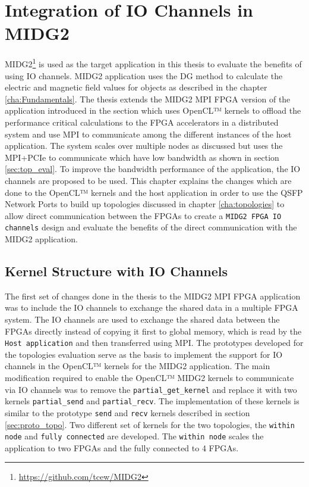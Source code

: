 \chapter{Integration of IO Channels in MIDG2}
\label{cha:sys_arch}

MIDG2\footnote{\url{https://github.com/tcew/MIDG2}} is used as the target
application in this thesis to evaluate the benefits of using IO channels.
MIDG2 application uses the \ac{DG} method to calculate the electric and magnetic
field values for objects as described in the chapter \ref{cha:Fundamentals}.
The thesis extends the MIDG2 MPI FPGA version of the application introduced in the
section \label{sec:midge_mpi} which uses OpenCL™ kernels to
offload the performance critical calculations to the FPGA accelerators in a
distributed system and use MPI to communicate among the different instances of the
host application. The system scales over multiple nodes as discussed but
uses the MPI+PCIe to communicate which have low bandwidth as shown in section
\ref{sec:top_eval}. To improve the bandwidth performance of the application,
the IO channels are proposed to be used. This chapter explains the changes
which are done to the OpenCL™ kernels and the host application in order to use
the QSFP Network Ports to build up topologies discussed in chapter
\ref{cha:topologies} to allow direct communication between the FPGAs to create a
\texttt{MIDG2 FPGA IO channels} design
and evaluate the benefits of the direct communication with the MIDG2 application.

\section{Kernel Structure with IO Channels}
\label{sec:struc_iochan}

The first set of changes done in the thesis to the MIDG2 MPI FPGA application
was to include the IO channels to exchange the shared data in a multiple FPGA system.
The IO channels are used to exchange the shared data between the FPGAs directly instead
of copying it first to global memory, which is read by the \texttt{Host application}
and then transferred using MPI. The prototypes developed for the topologies evaluation
serve as the basis to implement the support for IO channels in the OpenCL™ kernels for
the MIDG2 application. The main modification required to enable the OpenCL™ MIDG2
kernels to communicate via IO channels
was to remove the \texttt{partial\_get\_kernel} and replace it with two kernels
\texttt{partial\_send} and \texttt{partial\_recv}. The implementation of these kernels
is similar to the prototype \texttt{send} and \texttt{recv} kernels described in
section \ref{sec:proto_topo}. Two different set of kernels for the two topologies,
the \texttt{within node} and \texttt{fully connected} are developed. The \texttt{within node}
scales the application to two FPGAs and the fully connected to 4 FPGAs.

